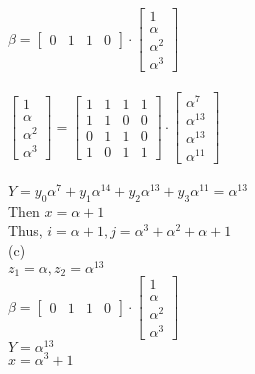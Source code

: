 \documentclass{article}
\begin{document}
$\beta =\left[ \begin{array}{llll}{0} & {1} & {1} & {0}\end{array}\right] \cdot \left[ \begin{array}{c}{1} \\ {\alpha} \\ {\alpha^{2}} \\ {\alpha^{3}}\end{array}\right]$\\\\
$\left[ \begin{array}{c}{1} \\ {\alpha} \\ {\alpha^{2}} \\ {\alpha^{3}}\end{array}\right]=\left[ \begin{array}{llll}{1} & {1} & {1} & {1} \\ {1} & {1} & {0} & {0} \\ {0} & {1} & {1} & {0} \\ {1} & {0} & {1} & {1}\end{array}\right] \cdot \left[ \begin{array}{c}{\alpha^{7}} \\ {\alpha^{13}} \\ {\alpha^{13}} \\ {\alpha^{11}}\end{array}\right]$\\\\
$Y = y_0\alpha^7 + y_1\alpha^{14} + y_2\alpha^{13} + y_3\alpha^{11} = \alpha^{13}$\\
Then $x = \alpha + 1$\\
Thus, $i = \alpha + 1, j = \alpha^3 + \alpha^2 + \alpha + 1$\\
(c)\\
$z_1 = \alpha, z_2 = \alpha^{13}$\\
$\beta =\left[ \begin{array}{llll}{0} & {1} & {1} & {0}\end{array}\right] \cdot \left[ \begin{array}{c}{1} \\ {\alpha} \\ {\alpha^{2}} \\ {\alpha^{3}}\end{array}\right]$\\
$Y = \alpha^{13}$\\
$x = \alpha^3 + 1$\\\\
\end{document}
